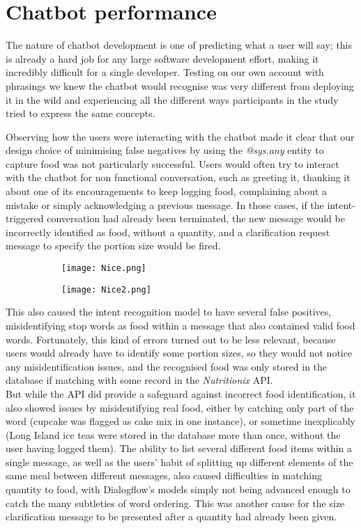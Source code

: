 \section{Chatbot performance}
The nature of chatbot development is one of predicting what a user will say; this is already a hard job for any large software development effort, making it incredibly difficult for a single developer.
Testing on our own account with phrasings we knew the chatbot would recognise was very different from deploying it in the wild and experiencing all the different ways participants in the study tried to express the same concepts.

Observing how the users were interacting with the chatbot made it clear that our design choice of minimising false negatives by using the \textit{@sys.any} entity to capture food was not particularly successful. Users would often try to interact with the chatbot for non functional conversation, such as greeting it, thanking it about one of its encouragements to keep logging food, complaining about a mistake or simply acknowledging a previous message. In those cases, if the intent-triggered conversation had already been terminated, the new message would be incorrectly identified as food, without a quantity, and a clarification request message to specify the portion size would be fired. \\
\begin{figure}[h!]
  \centering
  \begin{subfigure}[b]{\linewidth}
    \texttt{[image: Nice.png]}
  \end{subfigure}
  \begin{subfigure}[b]{\linewidth}
    \texttt{[image: Nice2.png]}
  \end{subfigure}
\end{figure}
This also caused the intent recognition model to have several false positives, misidentifying stop words as food within a message that also contained valid food words. Fortunately, this kind of errors turned out to be less relevant, because users would already have to identify some portion sizes, so they would not notice any misidentification issues, and the recognised food was only stored in the database if matching with some record in the \textit{Nutritionix} API. \\
But while the API did provide a safeguard against incorrect food identification, it also showed issues by misidentifying real food, either by catching only part of the word (cupcake was flagged as cake mix in one instance), or sometime inexplicably (Long Island ice teas were stored in the database more than once, without the user having logged them). The ability to list several different food items within a single message, as well as the users' habit of splitting up different elements of the same meal between different messages, also caused difficulties in matching quantity to food, with Dialogflow's models simply not being advanced enough to catch the many subtleties of word ordering. This was another cause for the size clarification message to be presented after a quantity had already been given.

